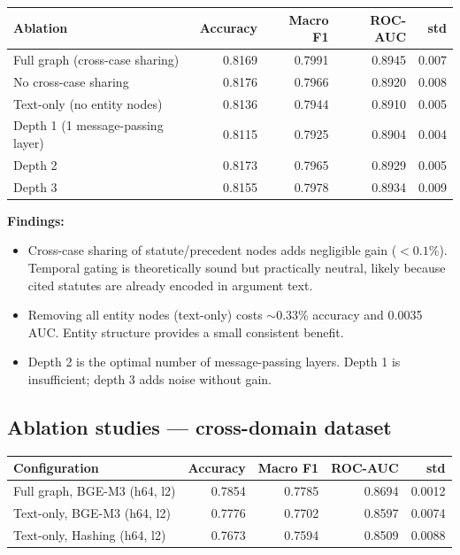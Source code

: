 \documentclass[12pt,a4paper]{article}
\begin{document}
\begin{center}
\begin{tabular}{lrrrr}
\toprule
\textbf{Ablation} & \textbf{Accuracy} & \textbf{Macro F1} & \textbf{ROC-AUC} & \textbf{std} \\
\midrule
Full graph (cross-case sharing) & 0.8169 & 0.7991 & 0.8945 & 0.007 \\
No cross-case sharing & 0.8176 & 0.7966 & 0.8920 & 0.008 \\
Text-only (no entity nodes) & 0.8136 & 0.7944 & 0.8910 & 0.005 \\
Depth 1 (1 message-passing layer) & 0.8115 & 0.7925 & 0.8904 & 0.004 \\
Depth 2 & 0.8173 & 0.7965 & 0.8929 & 0.005 \\
Depth 3 & 0.8155 & 0.7978 & 0.8934 & 0.009 \\
\bottomrule
\end{tabular}
\end{center}

\textbf{Findings:}
\begin{itemize}[noitemsep]
  \item Cross-case sharing of statute/precedent nodes adds negligible gain ($<0.1\%$). Temporal gating is theoretically sound but practically neutral, likely because cited statutes are already encoded in argument text.
  \item Removing all entity nodes (text-only) costs $\sim$0.33\% accuracy and 0.0035 AUC. Entity structure provides a small consistent benefit.
  \item Depth 2 is the optimal number of message-passing layers. Depth 1 is insufficient; depth 3 adds noise without gain.
\end{itemize}

\subsection{Ablation studies — cross-domain dataset}

\begin{center}
\begin{tabular}{lrrrr}
\toprule
\textbf{Configuration} & \textbf{Accuracy} & \textbf{Macro F1} & \textbf{ROC-AUC} & \textbf{std} \\
\midrule
Full graph, BGE-M3 (h64, l2) & 0.7854 & 0.7785 & 0.8694 & 0.0012 \\
Text-only, BGE-M3 (h64, l2) & 0.7776 & 0.7702 & 0.8597 & 0.0074 \\
Text-only, Hashing (h64, l2) & 0.7673 & 0.7594 & 0.8509 & 0.0088 \\
\bottomrule
\end{tabular}
\end{center}
\end{document}
